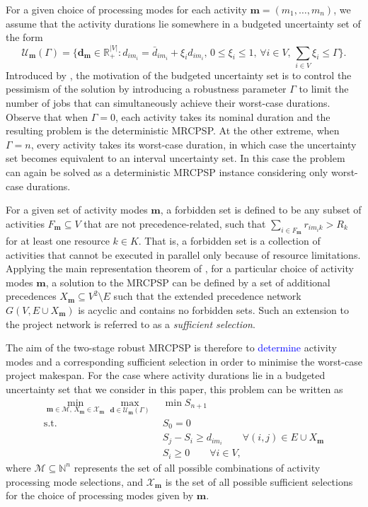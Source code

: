 \documentclass[a4paper,abstracton]{scrartcl}
\newcommand{\M}{{\mathcal{M}}}
\newcommand{\U}{{\mathcal{U}}}
\newcommand{\X}{{\mathcal{X}}}
\newcommand{\marc}[1]{\textcolor{blue}{#1}}
\begin{document}
For a given choice of processing modes for each activity $\bm{m}=(m_1,\dots,m_n)$, we assume that the activity durations lie somewhere in a budgeted uncertainty set of the form
$$\U_{\bm{m}}(\Gamma)=\Bigg\{\bm{d}_{\bm{m}}\in\mathbb{R}_+^{|V|}:d_{im_i}=\bar{d}_{im_i}+\xi_i\hat{d}_{im_i},\,0\leq \xi_i \leq 1,\,\forall i\in V,\,\sum_{i\in V}\xi_i \leq \Gamma\Bigg\}.$$
Introduced by \cite{bertsimas2004price}, the motivation of the budgeted uncertainty set is to control the pessimism of the solution by introducing a robustness parameter $\Gamma$ to limit the number of jobs that can simultaneously achieve their worst-case durations. Observe that when $\Gamma=0$, each activity takes its nominal duration and the resulting problem is the deterministic MRCPSP. At the other extreme, when $\Gamma=n$, every activity takes its worst-case duration, in which case the uncertainty set becomes equivalent to an interval uncertainty set. In this case the problem can again be solved as a deterministic MRCPSP instance considering only worst-case durations.

For a given set of activity modes $\bm{m}$, a forbidden set is defined to be any subset of activities $F_{\bm{m}}\subseteq V$ that are not precedence-related, such that $\sum_{i\in F_{\bm{m}}}r_{im_ik}>R_k$ for at least one resource $k\in K$. That is, a forbidden set is a collection of activities that cannot be executed in parallel only because of resource limitations. Applying the main representation theorem of \cite{bartusch1988scheduling}, for a particular choice of activity modes $\bm{m}$, a solution to the MRCPSP can be defined by a set of additional precedences $X_{\bm{m}}\subseteq V^2\setminus E$ such that the extended precedence network $G(V,E\cup X_{\bm{m}})$ is acyclic and contains no forbidden sets. Such an extension to the project network is referred to as a \textit{sufficient selection}.

The aim of the two-stage robust MRCPSP is therefore to 
\marc{determine}
activity modes and a corresponding sufficient selection in order to minimise the worst-case project makespan. For the case where activity durations lie in a budgeted uncertainty set that we consider in this paper, this problem can be written as
\begin{align}
	\min_{\bm{m}\in \M,\,X_{\bm{m}}\in \X_{\bm{m}}} \max_{\bm{d}\in\U_{\bm{m}}(\Gamma)}\ & \min S_{n+1}\label{eqn:robust_mrcpsp_1}\\
	\text{s.t. } & S_0 = 0\\
	& S_j - S_i \geq d_{im_i} \qquad \forall (i,j)\in E\cup X_{\bm{m}}\\
	& S_i \geq 0 \qquad \forall i\in V,\label{eqn:robust_mrcpsp_4}
\end{align}
where $\M\subseteq \mathbb{N}^n$ represents the set of all possible combinations of activity processing mode selections, and $\X_{\bm{m}}$ is the set of all possible sufficient selections for the choice of processing modes given by $\bm{m}$. 
\end{document}
